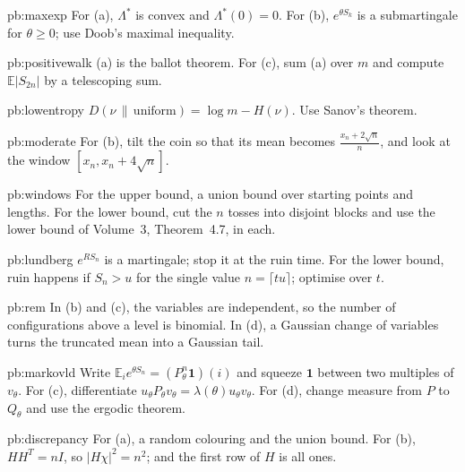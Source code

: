 \begin{hint}{pb:maxexp}
For (a), $\Lambda^*$ is convex and $\Lambda^*(0)=0$. For (b), $e^{\theta S_k}$ is a submartingale for $\theta\ge0$; use Doob's maximal inequality.
\end{hint}

\begin{hint}{pb:positivewalk}
(a) is the ballot theorem. For (c), sum (a) over $m$ and compute $\mathbb E|S_{2n}|$ by a telescoping sum.
\end{hint}

\begin{hint}{pb:lowentropy}
$D(\nu\,\|\,\text{uniform})=\log m-H(\nu)$. Use Sanov's theorem.
\end{hint}

\begin{hint}{pb:moderate}
For (b), tilt the coin so that its mean becomes $\frac{x_n+2\sqrt n}n$, and look at the window $[x_n,x_n+4\sqrt n]$.
\end{hint}

\begin{hint}{pb:windows}
For the upper bound, a union bound over starting points and lengths. For the lower bound, cut the $n$ tosses into disjoint blocks and use the lower bound of Volume~3,
Theorem~4.7, in each.
\end{hint}

\begin{hint}{pb:lundberg}
$e^{RS_n}$ is a martingale; stop it at the ruin time. For the lower bound, ruin happens if $S_n>u$ for the single value $n=\lceil tu\rceil$; optimise over $t$.
\end{hint}

\begin{hint}{pb:rem}
In (b) and (c), the variables are independent, so the number of configurations above a level is binomial. In (d), a Gaussian change of variables turns the truncated
mean into a Gaussian tail.
\end{hint}

\begin{hint}{pb:markovld}
Write $\mathbb E_ie^{\theta S_n}=(P_\theta^n\mathbf 1)(i)$ and squeeze $\mathbf 1$ between two multiples of $v_\theta$. For (c), differentiate $u_\theta P_\theta v_\theta=\lambda(\theta)u_\theta v_\theta$. For
(d), change measure from $P$ to $Q_\theta$ and use the ergodic theorem.
\end{hint}

\begin{hint}{pb:discrepancy}
For (a), a random colouring and the union bound. For (b), $HH^T=nI$, so $|H\chi|^2=n^2$; and the first row of $H$ is all ones.
\end{hint}

